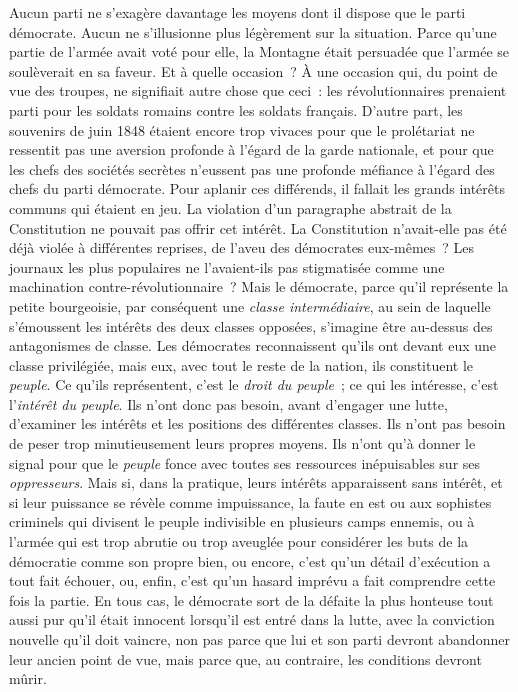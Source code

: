 \documentclass[french,twoside]{book} %
\begin{document}
Aucun parti ne s’exagère davantage les moyens dont il dispose que le parti démocrate. Aucun ne s’illusionne plus légèrement sur la situation. Parce qu’une partie de l’armée avait voté pour elle, la Montagne était persuadée que l’armée se soulèverait en sa faveur. Et à quelle occasion ? À une occasion qui, du point de vue des troupes, ne signifiait autre chose que ceci : les révolutionnaires prenaient parti pour les soldats romains contre les soldats français. D’autre part, les souvenirs de juin 1848 étaient encore trop vivaces pour que le prolétariat ne ressentit pas une aversion profonde à l’égard de la garde nationale, et pour que les chefs des sociétés secrètes n’eussent pas une profonde méfiance à l’égard des chefs du parti démocrate. Pour aplanir ces différends, il fallait les grands intérêts communs qui étaient en jeu. La violation d’un paragraphe abstrait de la Constitution ne pouvait pas offrir cet intérêt. La Constitution n’avait-elle pas été déjà violée à différentes reprises, de l’aveu des démocrates eux-mêmes ? Les journaux les plus populaires ne l’avaient-ils pas stigmatisée comme une machination contre-révolutionnaire ? Mais le démocrate, parce qu’il représente la petite bourgeoisie, par conséquent une \emph{classe intermédiaire}, au sein de laquelle s’émoussent les intérêts des deux classes opposées, s’imagine être au-dessus des antagonismes de classe. Les démocrates reconnaissent qu’ils ont devant eux une classe privilégiée, mais eux, avec tout le reste de la nation, ils constituent le \emph{peuple}. Ce qu’ils représentent, c’est le \emph{droit du peuple} ; ce qui les intéresse, c’est l’\emph{intérêt du peuple}. Ils n’ont donc pas besoin, avant d’engager une lutte, d’examiner les intérêts et les positions des différentes classes. Ils n’ont pas besoin de peser trop minutieusement leurs propres moyens. Ils n’ont qu’à donner le signal pour que le \emph{peuple} fonce avec toutes ses ressources inépuisables sur ses \emph{oppresseurs}. Mais si, dans la pratique, leurs intérêts apparaissent sans intérêt, et si leur puissance se révèle comme impuissance, la faute en est ou aux sophistes criminels qui divisent le peuple indivisible en plusieurs camps ennemis, ou à l’armée qui est trop abrutie ou trop aveuglée pour considérer les buts de la démocratie comme son propre bien, ou encore, c’est qu’un détail d’exécution a tout fait échouer, ou, enfin, c’est qu’un hasard imprévu a fait comprendre cette fois la partie. En tous cas, le démocrate sort de la défaite la plus honteuse tout aussi pur qu’il était innocent lorsqu’il est entré dans la lutte, avec la conviction nouvelle qu’il doit vaincre, non pas parce que lui et son parti devront abandonner leur ancien point de vue, mais parce que, au contraire, les conditions devront mûrir.\par
\end{document}
